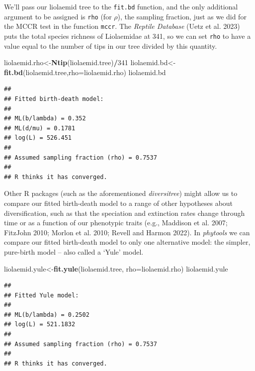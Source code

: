 \documentclass[fleqn,10pt,lineno]{wlpeerj} %
\newenvironment{Shaded}{\begin{snugshade}}{\end{snugshade}}
\newcommand{\AttributeTok}[1]{\textcolor[rgb]{0.13,0.29,0.53}{#1}}
\newcommand{\DecValTok}[1]{\textcolor[rgb]{0.00,0.00,0.81}{#1}}
\newcommand{\FunctionTok}[1]{\textcolor[rgb]{0.13,0.29,0.53}{\textbf{#1}}}
\newcommand{\NormalTok}[1]{#1}
\newcommand{\OtherTok}[1]{\textcolor[rgb]{0.56,0.35,0.01}{#1}}
\newcommand{\SpecialCharTok}[1]{\textcolor[rgb]{0.81,0.36,0.00}{\textbf{#1}}}
\begin{document}
We'll pass our liolaemid tree to the \texttt{fit.bd} function, and the only additional argument to be assigned is \texttt{rho} (for \(\rho\)), the sampling fraction, just as we did for the MCCR test in the function \texttt{mccr}. The \emph{Reptile Database} (Uetz et al. 2023) puts the total species richness of Liolaemidae at 341, so we can set \texttt{rho} to have a value equal to the number of tips in our tree divided by this quantity.

\begin{Shaded}
\begin{Highlighting}[]
\NormalTok{liolaemid.rho}\OtherTok{\textless{}{-}}\FunctionTok{Ntip}\NormalTok{(liolaemid.tree)}\SpecialCharTok{/}\DecValTok{341}
\NormalTok{liolaemid.bd}\OtherTok{\textless{}{-}}\FunctionTok{fit.bd}\NormalTok{(liolaemid.tree,}\AttributeTok{rho=}\NormalTok{liolaemid.rho)}
\NormalTok{liolaemid.bd}
\end{Highlighting}
\end{Shaded}

\begin{verbatim}
## 
## Fitted birth-death model:
## 
## ML(b/lambda) = 0.352 
## ML(d/mu) = 0.1781 
## log(L) = 526.451 
## 
## Assumed sampling fraction (rho) = 0.7537 
## 
## R thinks it has converged.
\end{verbatim}

Other R packages (such as the aforementioned \emph{diversitree}) might allow us to compare our fitted birth-death model to a range of other hypotheses about diversification, such as that the speciation and extinction rates change through time or as a function of our phenotypic traits (e.g., Maddison et al. 2007; FitzJohn 2010; Morlon et al. 2010; Revell and Harmon 2022). In \emph{phytools} we can compare our fitted birth-death model to only one alternative model: the simpler, pure-birth model -- also called a `Yule' model.

\begin{Shaded}
\begin{Highlighting}[]
\NormalTok{liolaemid.yule}\OtherTok{\textless{}{-}}\FunctionTok{fit.yule}\NormalTok{(liolaemid.tree,}
  \AttributeTok{rho=}\NormalTok{liolaemid.rho)}
\NormalTok{liolaemid.yule}
\end{Highlighting}
\end{Shaded}

\begin{verbatim}
## 
## Fitted Yule model:
## 
## ML(b/lambda) = 0.2502 
## log(L) = 521.1832 
## 
## Assumed sampling fraction (rho) = 0.7537 
## 
## R thinks it has converged.
\end{verbatim}
\end{document}
